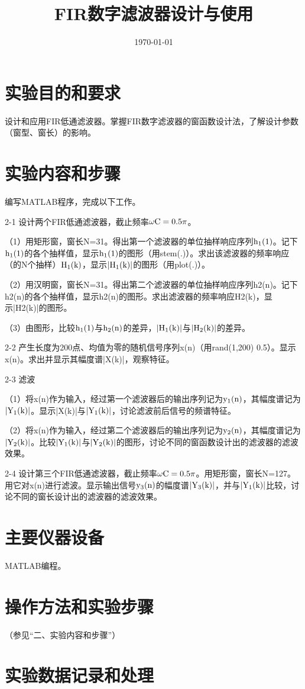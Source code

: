 \documentclass{../source/Experiment}
\title{FIR数字滤波器设计与使用}
\date{\today}
\begin{document}
    \makeheader
    \section{实验目的和要求}
    设计和应用FIR低通滤波器。掌握FIR数字滤波器的窗函数设计法，了解设计参数（窗型、窗长）的影响。
    \section{实验内容和步骤}
    编写MATLAB程序，完成以下工作。

    2-1 设计两个FIR低通滤波器，截止频率$ \rm \omega C = 0.5 \pi$。

    （1）用矩形窗，窗长N=31。得出第一个滤波器的单位抽样响应序列$ \rm h_1(1)$。记下$ \rm h_1(1)$的各个抽样值，显示$ \rm h_1(1)$的图形（用stem(.)）。求出该滤波器的频率响应（的N个抽样）$ \rm H_1(k)$，显示$| \rm H_1(k)|$的图形（用plot(.)）。

    （2）用汉明窗，窗长N=31。得出第二个滤波器的单位抽样响应序列h2(n)。记下h2(n)的各个抽样值，显示h2(n)的图形。求出滤波器的频率响应H2(k)，显示|H2(k)|的图形。

    （3）由图形，比较$ \rm h_1(1)$与$ \rm h_2(n)$的差异，$| \rm H_1(k)|$与$\rm |H_2(k)|$的差异。

    2-2 产生长度为200点、均值为零的随机信号序列x(n)（用rand(1,200)  0.5）。显示x(n)。求出并显示其幅度谱|X(k)|，观察特征。

    2-3 滤波

    （1）将x(n)作为输入，经过第一个滤波器后的输出序列记为$ \rm y_1(n)$，其幅度谱记为$|\rm Y_1(k)|$。显示|X(k)|与$\rm |Y_1(k)|$，讨论滤波前后信号的频谱特征。

    （2）将x(n)作为输入，经过第二个滤波器后的输出序列记为$\rm y_2(n)$，其幅度谱记为$|\rm Y_2(k)|$。比较$|\rm Y_1(k)|$与$|\rm Y_2(k)|$的图形，讨论不同的窗函数设计出的滤波器的滤波效果。

    2-4 设计第三个FIR低通滤波器，截止频率$\rm \omega C=0.5\pi$。用矩形窗，窗长N=127。用它对x(n)进行滤波。显示输出信号$ \rm y_3(n)$的幅度谱$\rm |Y_3(k)|$，并与$\rm |Y_1(k)|$比较，讨论不同的窗长设计出的滤波器的滤波效果。
    \section{主要仪器设备}
    MATLAB编程。
    \section{操作方法和实验步骤}
    （参见“二、实验内容和步骤”）
    \section{实验数据记录和处理}
\end{document}
